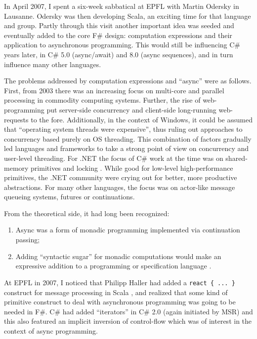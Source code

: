 \documentclass[acmsmall,screen]{acmart}
\begin{document}
In April 2007, I spent a six-week sabbatical at EPFL with Martin Odersky in Lausanne.  Odersky was then developing Scala, an exciting time for that language and group. Partly through this visit another important idea was seeded and eventually added to the core F\# design: computation expressions and their application to asynchronous programming.  This would still be influencing C\# years later, in C\# 5.0 (async/await) and 8.0 (async sequences), and in turn influence many other languages. 

The problems addressed by computation expressions and “async” were as follows.  First, from 2003 there was an increasing focus on multi-core and parallel processing in commodity computing systems. Further, the rise of web-programming put server-side concurrency and client-side long-running web-requests to the fore. Additionally, in the context of Windows, it could be assumed that “operating system threads were expensive”, thus ruling out approaches to concurrency based purely on OS threading.  This combination of factors gradually led languages and frameworks to take a strong point of view on concurrency and user-level threading.  For .NET the focus of C\# work at the time was on shared-memory primitives and locking \citep{Duffy2008concurrent}. While good for low-level high-performance primitives, the .NET community were crying out for better, more productive abstractions.  For many other languages, the focus was on actor-like message queueing systems, futures or continuations.  

From the theoretical side, it had long been recognized:

\begin{enumerate}
\item Async was a form of monadic programming \citep{citeulike:2104808} implemented via continuation passing;
\item Adding “syntactic sugar” for monadic computations would make an expressive addition to a programming or specification language \citep{HistoryOfHaskell}.
\end{enumerate}


At EPFL in 2007, I noticed that Philipp Haller had added a \texttt{react \{ ... \}} construct for message processing in Scala \citep{Haller2009}, and
realized that some kind of primitive construct to deal with asynchronous programming was going to be needed in F\#.  C\# had added ``iterators''
in C\# 2.0 (again initiated by MSR) and this also featured an implicit inversion of control-flow which was of interest in the context of async programming.
\end{document}
